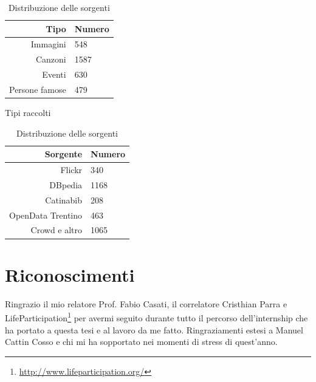 \documentclass{acm_proc_article-sp}
\begin{document}


\begin{table}
\parbox{.45\linewidth}{
\centering
\begin{tabular}{|r|l|}
\hline
Tipo & Numero \\
\hline
Immagini & 548 \\
Canzoni & 1587 \\
Eventi & 630 \\
Persone famose & 479 \\
\hline
\end{tabular}
\caption{Tipi raccolti}
\label{tab:entitykind}
}
\hfill
\parbox{.45\linewidth}{
\centering
\begin{tabular}{|r|l|}
\hline
Sorgente & Numero \\
\hline
Flickr & 340 \\
DBpedia & 1168 \\
Catinabib & 208 \\
OpenData Trentino & 463 \\
Crowd e altro & 1065 \\
\hline
\end{tabular}
\caption{Distribuzione delle sorgenti}
\label{tab:entitysource}
}
\end{table}





\section{Riconoscimenti}
Ringrazio il mio relatore Prof. Fabio Casati, il correlatore Cristhian Parra e LifeParticipation\footnote{\url{http://www.lifeparticipation.org/}} per avermi seguito durante tutto il percorso dell'internship che ha portato a questa tesi e al lavoro da me fatto. Ringraziamenti estesi a Manuel Cattin Cosso e chi mi ha sopportato nei momenti di stress di quest'anno.

%

%
%
\appendix






\balancecolumns
\end{document}

